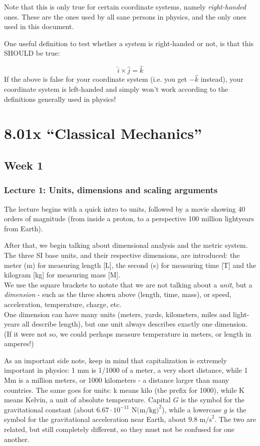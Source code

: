 \documentclass[12pt,a4paper]{report}
\begin{document}
Note that this is only true for certain coordinate systems, namely \emph{right-handed} ones. These are the ones used by all sane persons in physics, and the only ones used in this document.

One useful definition to test whether a system is right-handed or not, is that this SHOULD be true:

\[ \hat{i} \times \hat{j} = \hat{k} \]
If the above is false for your coordinate system (i.e. you get $-\hat{k}$ instead), your coordinate system is left-handed and simply won't work according to the definitions generally used in physics!

\part{8.01x ``Classical Mechanics''}

\setcounter{chapter}{0}

\chapter{Week 1}

\section{Lecture 1: Units, dimensions and scaling arguments}

The lecture begins with a quick intro to units, followed by a movie showing 40 orders of magnitude (from inside a proton, to a perspective 100 million lightyears from Earth).

After that, we begin talking about dimensional analysis and the metric system.
The three SI base units, and their respective dimensions, are introduced: the meter (m) for measuring length [L], the second (s) for measuring time [T] and the kilogram [kg] for measuring mass [M].\\
We use the square brackets to notate that we are not talking about a \emph{unit}, but a \emph{dimension} - such as the three shown above (length, time, mass), or speed, acceleration, temperature, charge, etc.\\
One dimension can have many units (meters, yards, kilometers, miles and light-years all describe length), but one unit always describes exactly one dimension. (If it were not so, we could perhaps measure temperature in meters, or length in amperes!)

As an important side note, keep in mind that capitalization is extremely important in physics: 1 mm is 1/1000 of a meter, a very short distance, while 1 Mm is a million meters, or 1000 kilometers - a distance larger than many countries. The same goes for units: k means kilo (the prefix for 1000), while K means Kelvin, a unit of absolute temperature. Capital $G$ is the symbol for the gravitational constant (about $6.67 \cdot 10^{-11} \text{ N(m/kg)}^2$), while a lowercase $g$ is the symbol for the gravitational acceleration near Earth, about $9.8 \text{ m/s}^2$. The two are related, but still completely different, so they must not be confused for one another.
\end{document}
